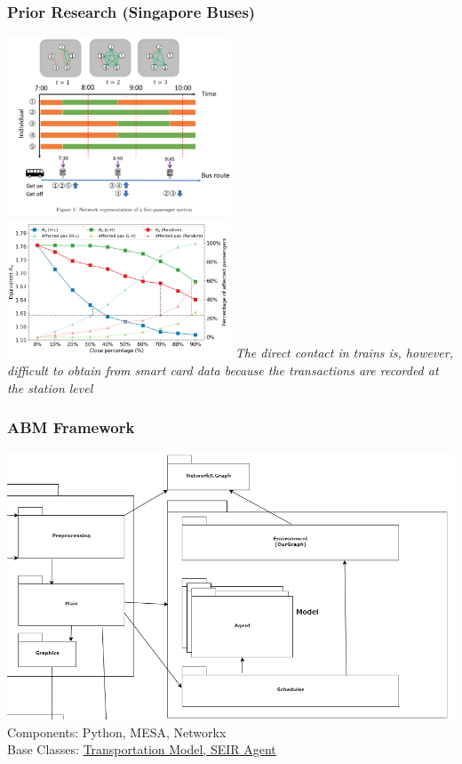 \documentclass{beamer}
\begin{document}
\begin{frame}
\frametitle{Prior Research (Singapore Buses)}
\includegraphics[width=0.5\textwidth]{Scratch_Visuals/Singapore_1.png}%
\includegraphics[width=0.5\textwidth]{Scratch_Visuals/Singapore_2.png}
\textit{The direct contact in trains is, however, difficult to obtain from smart card data because the transactions are recorded at the station level}
\cite{singapore_bus_2020}
\end{frame}
\begin{frame}
\frametitle{ABM Framework}
\includegraphics[width=1.0\textwidth]{Scratch_Visuals/covid_framework_summary.png}
Components: Python, MESA, Networkx\\
Base Classes: \href{https://github.com/cheung-ho-lum/NS_Epidemics_ABM_Approach/blob/master/Report/Design_doc_for_expansion_of_subway_model.pdf}{Transportation Model, SEIR Agent}
\end{frame}
\end{document}
